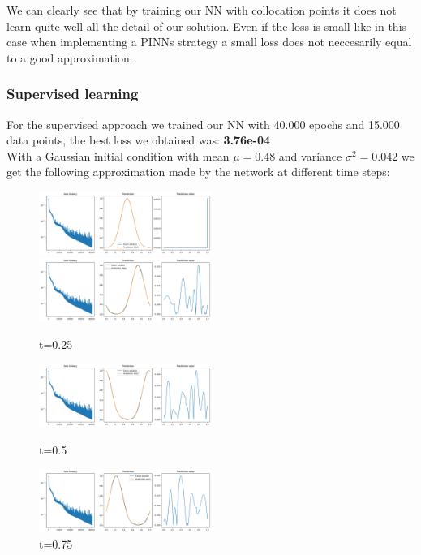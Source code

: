 \documentclass{article}
\begin{document}
We can clearly see that by training our NN with collocation points it does not learn quite well all the detail of our solution. 
Even if the loss is small like in this case when implementing a PINNs strategy a small loss does not neccesarily equal to a good approximation. 

\subsubsection{Supervised learning}

For the supervised approach we trained our NN with 40.000 epochs and 15.000 data points, the best loss we obtained was: \textbf{3.76e-04} \\

With a Gaussian initial condition with mean $\mu = 0.48$ and variance $\sigma^2 = 0.042$ we get the following approximation made by the network at different time steps:\\

\begin{figure}[!h]
    \centering
    \includegraphics[width=0.5\textwidth]{images/data1.png}

    \includegraphics[width=0.5\textwidth]{images/data2.png}
    \caption{t=0.25}

    \includegraphics[width=0.5\textwidth]{images/data3.png}
    \caption{t=0.5}

    \includegraphics[width=0.5\textwidth]{images/data4.png}
    \caption{t=0.75}
\end{figure}
\end{document}
